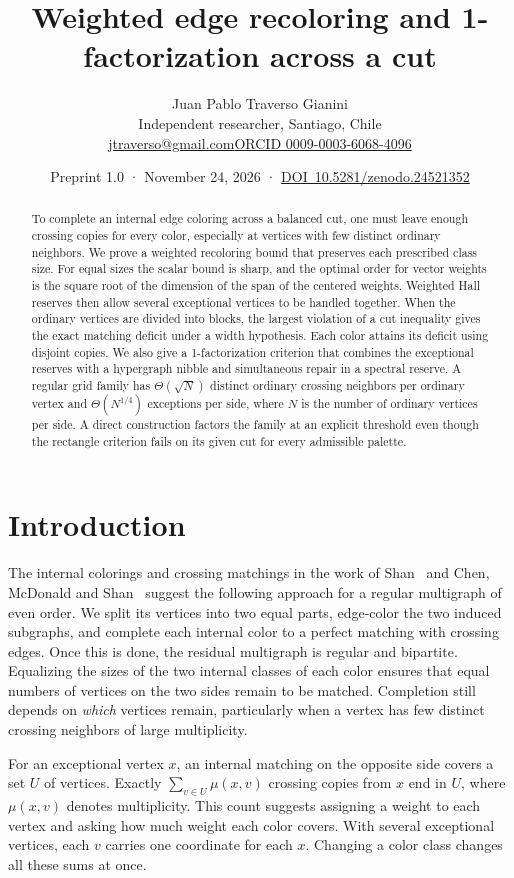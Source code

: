 \documentclass[11pt]{article}
\title{Weighted edge recoloring and 1-factorization across a cut}
\author{Juan Pablo Traverso Gianini\\\small Independent researcher, Santiago, Chile\\\small\href{mailto:jtraverso@gmail.com}{jtraverso@gmail.com}\quad\href{https://orcid.org/0009-0003-6068-4096}{ORCID 0009-0003-6068-4096}}
\date{Preprint 1.0 · November 24, 2026 · \mbox{\href{https://doi.org/10.5281/zenodo.24521352}{DOI 10.5281/zenodo.24521352}}}
\begin{document}
\maketitle

\begin{abstract}
To complete an internal edge coloring across a balanced cut, one must leave enough crossing copies for every color, especially at vertices with few distinct ordinary neighbors. We prove a weighted recoloring bound that preserves each prescribed class size. For equal sizes the scalar bound is sharp, and the optimal order for vector weights is the square root of the dimension of the span of the centered weights. Weighted Hall reserves then allow several exceptional vertices to be handled together. When the ordinary vertices are divided into blocks, the largest violation of a cut inequality gives the exact matching deficit under a width hypothesis. Each color attains its deficit using disjoint copies. We also give a 1-factorization criterion that combines the exceptional reserves with a hypergraph nibble and simultaneous repair in a spectral reserve. A regular grid family has \(\Theta(\sqrt N)\) distinct ordinary crossing neighbors per ordinary vertex and \(\Theta(N^{1/4})\) exceptions per side, where \(N\) is the number of ordinary vertices per side. A direct construction factors the family at an explicit threshold even though the rectangle criterion fails on its given cut for every admissible palette.
\end{abstract}

\section{Introduction}

The internal colorings and crossing matchings in the work of Shan~\cite{Shan} and Chen, McDonald and Shan~\cite{CMS} suggest the following approach for a regular multigraph of even order. We split its vertices into two equal parts, edge-color the two induced subgraphs, and complete each internal color to a perfect matching with crossing edges. Once this is done, the residual multigraph is regular and bipartite. Equalizing the sizes of the two internal classes of each color ensures that equal numbers of vertices on the two sides remain to be matched. Completion still depends on \emph{which} vertices remain, particularly when a vertex has few distinct crossing neighbors of large multiplicity.

For an exceptional vertex \(x\), an internal matching on the opposite side covers a set \(U\) of vertices. Exactly \(\sum_{v\in U}\mu(x,v)\) crossing copies from \(x\) end in \(U\), where \(\mu(x,v)\) denotes multiplicity. This count suggests assigning a weight to each vertex and asking how much weight each color covers. With several exceptional vertices, each \(v\) carries one coordinate for each \(x\). Changing a color class changes all these sums at once.
\end{document}

